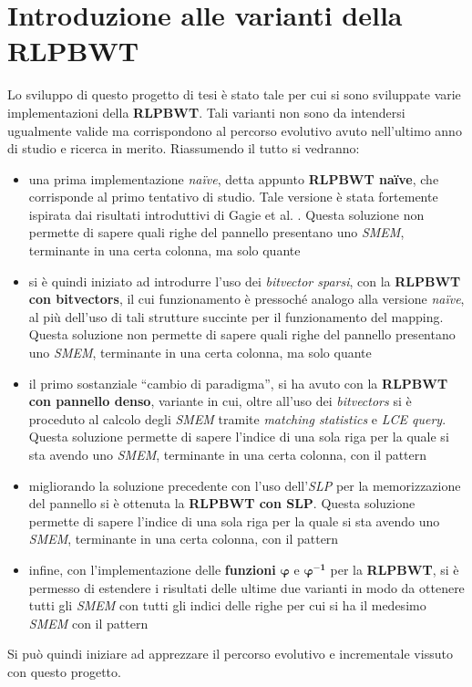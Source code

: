 \section{Introduzione alle varianti della RLPBWT}
Lo sviluppo di questo progetto di tesi è stato tale per cui si sono sviluppate
varie implementazioni della \textbf{RLPBWT}. Tali varianti non sono da
intendersi ugualmente valide ma corrispondono al percorso evolutivo avuto
nell'ultimo anno di studio e ricerca in merito. Riassumendo il tutto si
vedranno:
\begin{itemize}
  \item una prima implementazione \textit{na\"{i}ve}, detta appunto
  \textbf{RLPBWT na\"{i}ve}, che corrisponde al primo tentativo di studio. Tale
  versione è stata 
  fortemente ispirata dai risultati introduttivi di Gagie et
  al. \cite{tricks}. Questa soluzione non 
  permette di sapere quali righe del pannello presentano uno \textit{SMEM},
  terminante in una certa colonna, ma solo quante
  \item si è quindi iniziato ad introdurre l'uso dei \textit{bitvector sparsi},
  con la 
  \textbf{RLPBWT con bitvectors}, il cui funzionamento è pressoché analogo alla
  versione \textit{na\"{i}ve}, al più dell'uso di tali strutture succinte per il
  funzionamento del mapping. Questa soluzione non
  permette di sapere quali righe del pannello presentano uno \textit{SMEM},
  terminante in una certa colonna, ma solo quante
  \item il primo sostanziale ``cambio di paradigma'', si ha avuto con la
  \textbf{RLPBWT con pannello denso}, variante in cui, oltre all'uso dei
  \textit{bitvectors} si è proceduto al calcolo degli \textit{SMEM} tramite
  \textit{matching statistics} e \textit{LCE query}. Questa soluzione permette
  di sapere l'indice di una sola riga per la quale si sta avendo uno
  \textit{SMEM}, terminante in una certa colonna, con il pattern 
  \item migliorando la soluzione precedente con l'uso dell'\textit{SLP} per la
  memorizzazione del pannello si è ottenuta la \textbf{RLPBWT con SLP}. Questa
  soluzione permette di sapere l'indice di una sola riga per la quale si sta
  avendo uno \textit{SMEM}, terminante in una certa colonna, con il pattern 
  \item infine, con l'implementazione delle \textbf{funzioni}
  $\boldsymbol\varphi$ e $\boldsymbol\varphi^\mathbf{-1}$ per la 
  \textbf{RLPBWT}, si è permesso di estendere i risultati delle ultime due
  varianti in modo da ottenere tutti gli \textit{SMEM} con tutti gli indici
  delle righe per cui si ha il medesimo \textit{SMEM} con il pattern
\end{itemize}
Si può quindi iniziare ad apprezzare il percorso evolutivo e incrementale
vissuto con questo progetto.
